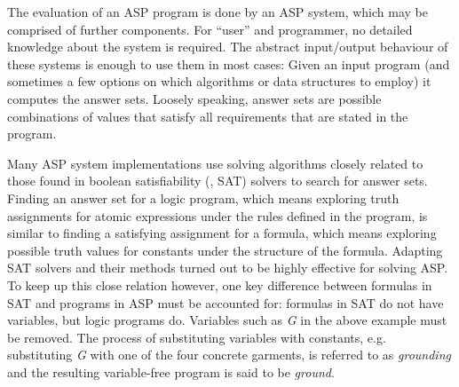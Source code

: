\documentclass{vutinfth} %
\begin{document}
The evaluation of an ASP program is done by an ASP system, which may be comprised of further components. For \enquote{user} and programmer, no detailed knowledge about the system is required. The abstract input/output behaviour of these systems is enough to use them in most cases: Given an input program (and sometimes a few options on which algorithms or data structures to employ) it computes the answer sets. Loosely speaking, answer sets are possible combinations of values that satisfy all requirements that are stated in the program.


Many ASP system implementations use solving algorithms closely related to those found in boolean satisfiability (\cite{sat}, SAT) solvers to search for answer sets. Finding an answer set for a logic program, which means exploring truth assignments for atomic expressions under the rules defined in the program, is similar to finding a satisfying assignment for a formula, which means exploring possible truth values for constants under the structure of the formula. Adapting SAT solvers and their methods turned out to be highly effective for solving ASP. To keep up this close relation however, one key difference between formulas in SAT and programs in ASP must be accounted for: formulas in SAT do not have variables, but logic programs do. Variables such as \emph{G} in the above example must be removed. The process of substituting variables with constants, e.g. substituting \emph{G} with one of the four concrete garments, is referred to as \emph{grounding} and the resulting variable-free program is said to be \emph{ground}.
\end{document}
